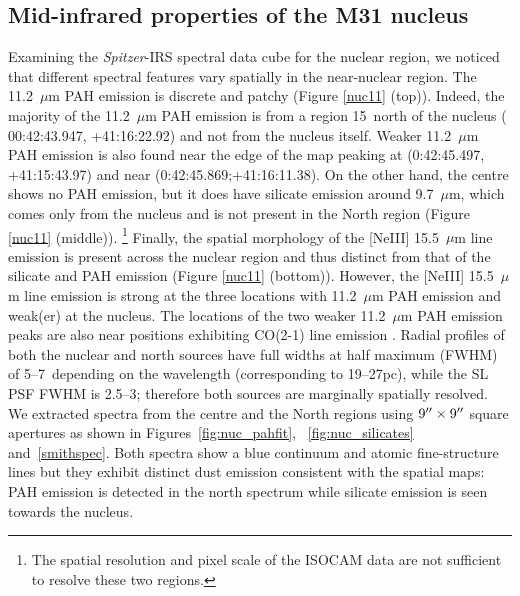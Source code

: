 
\subsection{Mid-infrared properties of the M31 nucleus}
\label{sect:nucleus}


Examining the {\em Spitzer}-IRS spectral data cube for the nuclear region, we noticed that different spectral features vary spatially in the near-nuclear region.
The 11.2~$\mu$m PAH emission is discrete and patchy (Figure \ref{nuc11} (top)).  Indeed, the majority of the 11.2~$\mu$m  PAH emission is from a region 15\arcsec\ north of the nucleus (
00:42:43.947, +41:16:22.92) and not from the nucleus itself. Weaker 11.2~$\mu$m PAH emission is also found near the edge of the map peaking at (0:42:45.497, +41:15:43.97) and near (0:42:45.869;+41:16:11.38).
On the other hand, the centre shows no PAH emission, but it does have silicate emission around 9.7~$\mu$m, which comes only from the nucleus and is not present in the North region (Figure \ref{nuc11} (middle)).%
\footnote{The spatial resolution and pixel scale of the ISOCAM data are not sufficient to resolve these two regions.}
Finally, the spatial morphology of the [NeIII] 15.5~$\mu$m line emission is present across the nuclear region and thus distinct from that of the silicate and PAH emission (Figure \ref{nuc11} (bottom)). However, the [NeIII] 15.5~$\mu$m line emission is strong at the three locations with 11.2~$\mu$m PAH emission and weak(er) at the nucleus. The locations of the two weaker 11.2~$\mu$m PAH emission peaks are also near positions exhibiting CO(2-1) line emission \citep[\#36 and 28 of][the strongest 11.2~$\mu$m PAH emission peak is outside the CO FOV]{Melchior2013}. 
Radial profiles of both the nuclear and north sources have full widths at half maximum (FWHM) of 5--7\arcsec\ 
depending on the wavelength (corresponding to 19--27pc), while the SL PSF FWHM is 2.5--3\arcsec; therefore both sources are marginally spatially resolved.  
We extracted spectra from the centre and the North regions using  $9\hbox{$^{\prime\prime}$} \times 9\hbox{$^{\prime\prime}$}$ 
square apertures as shown in Figures~\ref{fig:nuc_pahfit}, ~\ref{fig:nuc_silicates} and~\ref{smithspec}. 
Both spectra show a blue continuum and atomic fine-structure lines but they exhibit distinct dust emission consistent with the spatial maps: PAH emission is detected in the north spectrum while silicate emission is seen towards the nucleus. 

